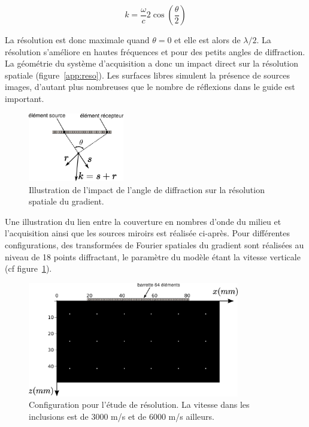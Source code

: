 \begin{equation}
	k= \frac{\omega}{c} 2 \cos\left( \frac{\theta}{2}\right)
	\label{app:nb_onde}
\end{equation}

La résolution est donc maximale quand $\theta=0$ et elle est alors de $\lambda/2$. La résolution s'améliore en hautes fréquences et pour des petits angles de diffraction. La géométrie du système d'acquisition a donc un impact direct sur la résolution spatiale (figure~\ref{app:reso}). Les surfaces libres simulent la présence de sources images, d'autant plus nombreuses que le nombre de réflexions dans le guide est important. \\

\begin{figure}[!h]
	\centering
	\includegraphics[height=3cm]{img/reso.png}
	\caption{Illustration de l'impact de l'angle de diffraction sur la résolution spatiale du gradient.}
\end{figure}


Une illustration du lien entre la couverture en nombres d'onde du milieu et l'acquisition ainsi que les sources miroirs est réalisée ci-après. Pour différentes configurations, des transformées de Fourier spatiales du gradient sont réalisées au niveau de 18 points diffractant, le paramètre du modèle étant la vitesse verticale (cf figure~\ref{app:config_reso}).

\begin{figure}[!h]
	\centering
	\includegraphics[height=5cm]{img/vp_scat.png}
	\caption{Configuration pour l'étude de résolution. La vitesse dans les inclusions est de 3000 m/s et de 6000 m/s ailleurs. \label{app:config_reso}}
\end{figure}


